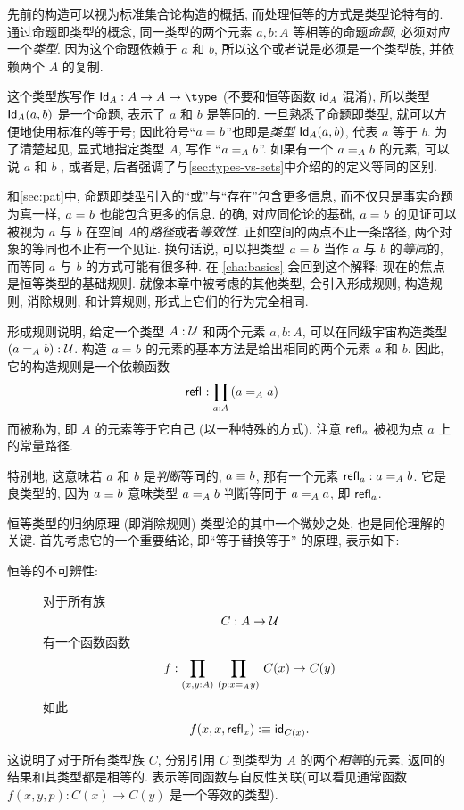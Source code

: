 %
%
%
%
先前的构造可以视为标准集合论构造的概括, 而处理恒等的方式是类型论特有的.
通过命题即类型的概念, 同一类型的两个元素 $a,b:A$ 等相等的命题\emph{命题}, 必须对应一个\emph{类型}.
因为这个命题依赖于 $a$ 和 $b$, 所以这个或者说是必须是一个类型族, 并依赖两个 $A$ 的复制.

这个类型族写作 $\idtypevar{A}:A\to A\to\type$ (不要和恒等函数 $\idfunc[A]$ 混淆), 所以类型 $\idtype[A]ab$ 是一个命题, 表示了 $a$ 和 $b$ 是等同的.
一旦熟悉了命题即类型, 就可以方便地使用标准的等于号;
因此符号``$\id{a}{b}$''也即是\emph{类型} $\idtype[A]ab$, 代表 $a$ 等于 $b$.
为了清楚起见, 显式地指定类型 $A$, 写作 ``$\id[A]{a}{b}$''.
如果有一个 $\id[A]{a}{b}$ 的元素, 可以说 $a$ 和 $b$ , 或者是, 后者强调了与\cref{sec:types-vs-sets}中介绍的的定义等同的区别.
%
%

和\cref{sec:pat}中, 命题即类型引入的``或''与``存在''包含更多信息, 而不仅只是事实命题为真一样, $\id{a}{b}$ 也能包含更多的信息.
的确, 对应同伦论的基础, $\id{a}{b}$ 的见证可以被视为 $a$ 与 $b$ 在空间 $A$的\emph{路径}或者\emph{等效性}.
正如空间的两点不止一条路径, 两个对象的等同也不止有一个见证.
换句话说, 可以把类型 $\id{a}{b}$ 当作 $a$ 与 $b$ 的\emph{等同}的, 而等同 $a$ 与 $b$ 的方式可能有很多种.
在 \cref{cha:basics} 会回到这个解释;
现在的焦点是恒等类型的基础规则.
就像本章中被考虑的其他类型, 会引入形成规则, 构造规则, 消除规则, 和计算规则, 形式上它们的行为完全相同.

形成规则说明, 给定一个类型 $A:\UU$ 和两个元素 $a,b:A$, 可以在同级宇宙构造类型 $(\id[A]{a}{b}):\UU$.
构造 $\id{a}{b}$ 的元素的基本方法是给出相同的两个元素 $a$ 和 $b$.
因此, 它的构造规则是一个依赖函数
\[
    \refl{} : \prd{a:A} (\id[A]{a}{a})
\]
而被称为,
%
即 $A$ 的元素等于它自己 (以一种特殊的方式).
注意 $\refl{a}$ 被视为点 $a$ 上的常量路径.

特别地, 这意味若 $a$ 和 $b$ 是\emph{判断}等同的, $a\jdeq b$, 那有一个元素 $\refl{a} : \id[A]{a}{b}$.
它是良类型的, 因为 $a\jdeq b$ 意味类型 $\id[A]{a}{b}$ 判断等同于 $\id[A]{a}{a}$, 即 $\refl{a}$.

恒等类型的归纳原理 (即消除规则) 类型论的其中一个微妙之处, 也是同伦理解的关键.
首先考虑它的一个重要结论, 即``等于替换等于'' 的原理, 表示如下: %
%
\begin{description}
    \item[恒等的不可辨性:]
    对于所有族
    \[
        C : A \to \UU
    \]
    有一个函数函数
    \[
        f : \prd{x,y:A}{p:\id[A] x y} C(x) \to C(y)
    \]
    如此
    \[
        f(x,x,\refl{x}) \defeq \idfunc[C(x)].
    \]
\end{description}
这说明了对于所有类型族 $C$, 分别引用 $C$ 到类型为  $A$ 的两个\emph{相等}的元素, 返回的结果和其类型都是相等的.
表示等同函数与自反性关联(可以看见通常函数 $f(x,y,p): C(x) \to C(y)$ 是一个等效的类型).


